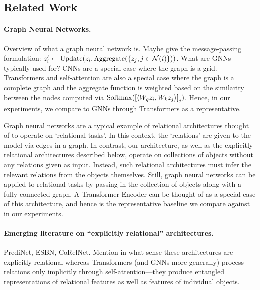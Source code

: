 \subsection{Related Work}


\paragraph{Graph Neural Networks.} Overview of what a graph neural network is. Maybe give the message-passing formulation: $z_i' \gets \mathrm{Update}(z_i, \mathrm{Aggregate}(\left\{z_j, j \in {\mathcal{N}}(i)\right\}))$. What are GNNs typically used for? CNNs are a special case where the graph is a grid. Transformers and self-attention are also a special case where the graph is a complete graph and the aggregate function is weighted based on the similarity between the nodes computed via $\mathrm{Softmax}(\left[\left \langle W_q z_i, W_k z_j \right\rangle\right]_j)$. Hence, in our experiments, we compare to GNNs through Transformers as a representative.

Graph neural networks are a typical example of relational architectures thought of to operate on `relational tasks'. In this context, the `relations' are given to the model via edges in a graph. In contrast, our architecture, as well as the explicitly relational architectures described below, operate on collections of objects without any relations given as input. Instead, such relational architectures must infer the relevant relations from the objects themselves. Still, graph neural networks can be applied to relational tasks by passing in the collection of objects along with a fully-connected graph. A Transformer Encoder can be thought of as a special case of this architecture, and hence is the representative baseline we compare against in our experiments.

\paragraph{Emerging literature on ``explicitly relational'' architectures.} PrediNet, ESBN, CoRelNet. Mention in what sense these architectures are explicitly relational whereas Transformers (and GNNs more generally) process relations only implicitly through self-attention---they produce entangled representations of relational features as well as features of individual objects.